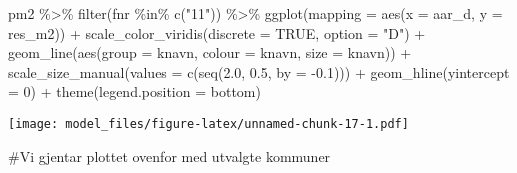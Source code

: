 \documentclass[
]{article}
\newenvironment{Shaded}{\begin{snugshade}}{\end{snugshade}}
\newcommand{\AttributeTok}[1]{\textcolor[rgb]{0.77,0.63,0.00}{#1}}
\newcommand{\ConstantTok}[1]{\textcolor[rgb]{0.00,0.00,0.00}{#1}}
\newcommand{\DecValTok}[1]{\textcolor[rgb]{0.00,0.00,0.81}{#1}}
\newcommand{\FloatTok}[1]{\textcolor[rgb]{0.00,0.00,0.81}{#1}}
\newcommand{\FunctionTok}[1]{\textcolor[rgb]{0.00,0.00,0.00}{#1}}
\newcommand{\NormalTok}[1]{#1}
\newcommand{\SpecialCharTok}[1]{\textcolor[rgb]{0.00,0.00,0.00}{#1}}
\newcommand{\StringTok}[1]{\textcolor[rgb]{0.31,0.60,0.02}{#1}}
\begin{document}
\begin{Shaded}
\begin{Highlighting}[]
\NormalTok{pm2 }\SpecialCharTok{\%\textgreater{}\%} \FunctionTok{filter}\NormalTok{(fnr }\SpecialCharTok{\%in\%} \FunctionTok{c}\NormalTok{(}\StringTok{"11"}\NormalTok{)) }\SpecialCharTok{\%\textgreater{}\%}
\FunctionTok{ggplot}\NormalTok{(}\AttributeTok{mapping =} \FunctionTok{aes}\NormalTok{(}\AttributeTok{x =}\NormalTok{ aar\_d, }\AttributeTok{y =}\NormalTok{ res\_m2)) }\SpecialCharTok{+}
\FunctionTok{scale\_color\_viridis}\NormalTok{(}\AttributeTok{discrete =} \ConstantTok{TRUE}\NormalTok{, }\AttributeTok{option =} \StringTok{"D"}\NormalTok{) }\SpecialCharTok{+}
\FunctionTok{geom\_line}\NormalTok{(}\FunctionTok{aes}\NormalTok{(}\AttributeTok{group =}\NormalTok{ knavn, }\AttributeTok{colour =}\NormalTok{ knavn, }\AttributeTok{size =}\NormalTok{ knavn)) }\SpecialCharTok{+}
\FunctionTok{scale\_size\_manual}\NormalTok{(}\AttributeTok{values =} \FunctionTok{c}\NormalTok{(}\FunctionTok{seq}\NormalTok{(}\FloatTok{2.0}\NormalTok{, }\FloatTok{0.5}\NormalTok{, }\AttributeTok{by =} \SpecialCharTok{{-}}\FloatTok{0.1}\NormalTok{))) }\SpecialCharTok{+}
\FunctionTok{geom\_hline}\NormalTok{(}\AttributeTok{yintercept =} \DecValTok{0}\NormalTok{) }\SpecialCharTok{+}
\FunctionTok{theme}\NormalTok{(}\AttributeTok{legend.position =} \StringTok{\textquotesingle{}bottom\textquotesingle{}}\NormalTok{)}
\end{Highlighting}
\end{Shaded}

\texttt{[image: model\_files/figure-latex/unnamed-chunk-17-1.pdf]}

\#Vi gjentar plottet ovenfor med utvalgte kommuner
\end{document}
